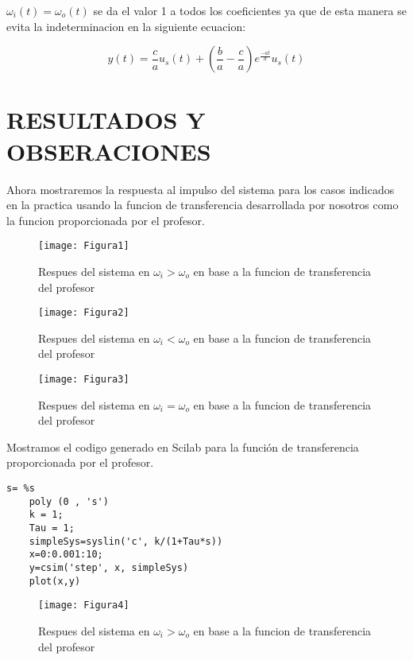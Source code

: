 \documentclass{report}
\newcounter{ns}
\begin{document}
	$\omega_i(t) = \omega_o(t)$ se da el valor 1 a todos los coeficientes ya que de esta manera se evita la indeterminacion en la siguiente ecuacion:
	
	\begin{equation*}
	y(t)=\frac{c}{a}u_s(t)+\left(\frac{b}{a}-\frac{c}{a}\right)e^\frac{-at}{d}u_s(t)
	\end{equation*}
	
	\chapter*{RESULTADOS Y OBSERACIONES}
	
	Ahora mostraremos la respuesta al impulso del sistema para los casos indicados en la practica usando la funcion de transferencia desarrollada por nosotros como la funcion proporcionada por el profesor.\\
	
	\begin{figure}[H]
		\centering
		\texttt{[image: Figura1]}
		\caption{Respues del sistema en $\omega_i > \omega_o$ en base a la funcion de transferencia del profesor}
		\label{fig:figura7}
	\end{figure}		

	\begin{figure}[H]
		\centering
		\texttt{[image: Figura2]}
		\caption{Respues del sistema en $\omega_i < \omega_o$ en base a la funcion de transferencia del profesor}
		\label{fig:figura7}
	\end{figure}
	
	\begin{figure}[H]
		\centering
		\texttt{[image: Figura3]}
		\caption{Respues del sistema en $\omega_i = \omega_o$ en base a la funcion de transferencia del profesor}
		\label{fig:figura7}
	\end{figure}
	
	Mostramos el codigo generado en Scilab para la función de transferencia proporcionada por el profesor.\\
	
	\begin{lstlisting}[frame=single]
	s= %s
	poly (0 , 's')
	k = 1;
	Tau = 1;
	simpleSys=syslin('c', k/(1+Tau*s))
	x=0:0.001:10;
	y=csim('step', x, simpleSys)
	plot(x,y)
	\end{lstlisting}
	
	\begin{figure}[H]
		\centering
		\texttt{[image: Figura4]}
		\caption{Respues del sistema en $\omega_i > \omega_o$ en base a la funcion de transferencia del profesor}
		\label{fig:figura7}
	\end{figure}
\end{document}
